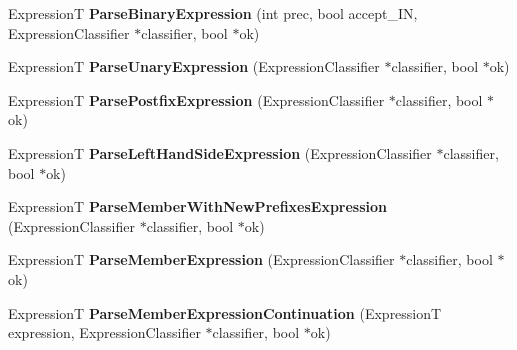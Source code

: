 \begin{DoxyCompactItemize}
\item 
ExpressionT {\bfseries Parse\+Binary\+Expression} (int prec, bool accept\+\_\+\+IN, Expression\+Classifier $\ast$classifier, bool $\ast$ok)\hypertarget{classv8_1_1internal_1_1_parser_base_addc57c20122827dfce08eed241a462d3}{}\label{classv8_1_1internal_1_1_parser_base_addc57c20122827dfce08eed241a462d3}

\item 
ExpressionT {\bfseries Parse\+Unary\+Expression} (Expression\+Classifier $\ast$classifier, bool $\ast$ok)\hypertarget{classv8_1_1internal_1_1_parser_base_a768c2f9158040eb20b92843fb0c5c1d6}{}\label{classv8_1_1internal_1_1_parser_base_a768c2f9158040eb20b92843fb0c5c1d6}

\item 
ExpressionT {\bfseries Parse\+Postfix\+Expression} (Expression\+Classifier $\ast$classifier, bool $\ast$ok)\hypertarget{classv8_1_1internal_1_1_parser_base_a22f87d90619d1dee4c2dbf21f2e3cafb}{}\label{classv8_1_1internal_1_1_parser_base_a22f87d90619d1dee4c2dbf21f2e3cafb}

\item 
ExpressionT {\bfseries Parse\+Left\+Hand\+Side\+Expression} (Expression\+Classifier $\ast$classifier, bool $\ast$ok)\hypertarget{classv8_1_1internal_1_1_parser_base_a6b4342490080078ef06b3ed7a3d69bfc}{}\label{classv8_1_1internal_1_1_parser_base_a6b4342490080078ef06b3ed7a3d69bfc}

\item 
ExpressionT {\bfseries Parse\+Member\+With\+New\+Prefixes\+Expression} (Expression\+Classifier $\ast$classifier, bool $\ast$ok)\hypertarget{classv8_1_1internal_1_1_parser_base_a75c2a1b1b81cc6c93bc894df89578f76}{}\label{classv8_1_1internal_1_1_parser_base_a75c2a1b1b81cc6c93bc894df89578f76}

\item 
ExpressionT {\bfseries Parse\+Member\+Expression} (Expression\+Classifier $\ast$classifier, bool $\ast$ok)\hypertarget{classv8_1_1internal_1_1_parser_base_a5d8813edd69cb34fcdeadd5f0a36a99b}{}\label{classv8_1_1internal_1_1_parser_base_a5d8813edd69cb34fcdeadd5f0a36a99b}

\item 
ExpressionT {\bfseries Parse\+Member\+Expression\+Continuation} (ExpressionT expression, Expression\+Classifier $\ast$classifier, bool $\ast$ok)\hypertarget{classv8_1_1internal_1_1_parser_base_af2037d4d9bb5598794d99727703a780e}{}\label{classv8_1_1internal_1_1_parser_base_af2037d4d9bb5598794d99727703a780e}


\end{DoxyCompactItemize}

